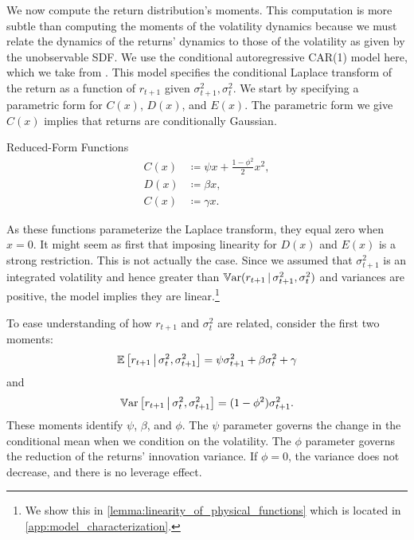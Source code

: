 \documentclass[11pt, letterpaper, twoside]{article}
\begin{document}
We now compute the return distribution's moments. This computation is more subtle than computing the moments of the volatility dynamics because we must relate the dynamics of the returns' dynamics to those of the volatility as given by the unobservable SDF. We use the conditional autoregressive CAR(1) model here, which we take from \textcite{darolles2006structural,han2018leverage}. This model specifies the conditional Laplace transform of the return as a function of $r_{t+1}$ given $\sigma^2_{t+1}, \sigma^2_t$. We start by specifying a parametric form for $C(x)$, $D(x)$, and $E(x)$. The parametric form we give  $C(x)$ implies that returns are conditionally Gaussian.

\begin{defn}{Reduced-Form Functions}
    \label{defn:physical_return_dynamics}
    \begin{align}
        C(x) &\coloneqq \psi x + \frac{1 - \phi^2}{2} x^2, \\
        D(x) &\coloneqq \beta x, \\
        C(x) &\coloneqq \gamma x. 
    \end{align}
\end{defn}

As these functions parameterize the Laplace transform, they equal zero when $x=0$. It might seem as first that imposing linearity for $D(x)$ and $E(x)$ is a strong restriction. This is not actually the case. Since we assumed that $\sigma^2_{t+1}$ is an integrated volatility and hence greater than $\operatorname{\mathbb{V}ar}(r_{t+1} \,\vert\, \sigma^2_{t+1}, \sigma^2_{t})$ and variances are positive, the model implies they are linear.\footnote{We show this in \cref{lemma:linearity_of_physical_functions} which is located in \cref{app:model_characterization}.}

To ease understanding of how $r_{t+1}$ and $\sigma^2_t$ are related, consider the first two moments:
%
\begin{equation}
    \label{eqn:rtn_cond_mean}
    \operatorname{\mathbb{E}}\left[r_{t+1} \,\middle\vert\, \sigma^2_t, \sigma^2_{t+1}\right] = \psi \sigma^2_{t+1} + \beta \sigma^2_t + \gamma \\
\end{equation}
%
and
%
\begin{equation}
    \label{eqn:rtn_cond_vol}
    \operatorname{\mathbb{V}ar}\left[r_{t+1} \,\middle\vert\, \sigma^2_t, \sigma^2_{t+1}\right] = (1 - \phi^2) \sigma^2_{t+1}.
\end{equation}
%
These moments identify $\psi$, $\beta$, and $\phi$. The $\psi$ parameter governs the change in the conditional mean when we condition on the volatility. The $\phi$ parameter governs the reduction of the returns' innovation variance. If $\phi=0$, the variance does not decrease, and there is no leverage effect.  
\end{document}
